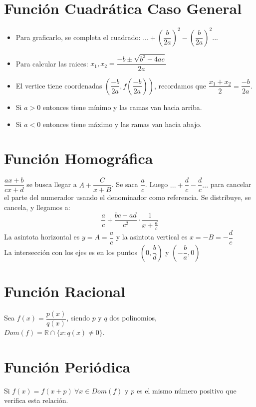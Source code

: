 \documentclass[11pt,a4paper]{article}
\begin{document}
\section{Funci\'on Cuadr\'atica Caso General}
\begin{itemize}
\item Para graficarlo, se completa el cuadrado: $... + \left(\dfrac{b}{2a}\right)^2 - \left(\dfrac{b}{2a}\right)^2...$
\item Para calcular las raices: $x_1, x_2 = \dfrac{-b \pm \sqrt{b^2 - 4ac}}{2a}$
\item El vertice tiene coordenadas $\left(\dfrac{-b}{2a}, f(\dfrac{-b}{2a})\right)$, recordamos que $\dfrac{x_1 + x_2}{2} = \dfrac{-b}{2a}$.
\item Si $a > 0$ entonces tiene m\'inimo y las ramas van hacia arriba.
\item Si $a < 0$ entonces tiene m\'aximo y las ramas van hacia abajo.
\end{itemize}

\section{Funci\'on Homogr\'afica}
\noindent $\dfrac{ax+b}{cx+d}$ se busca llegar a $A + \dfrac{C}{x+B}$. Se saca $\dfrac{a}{c}$. Luego $...+\dfrac{d}{c}-\dfrac{d}{c}...$ para cancelar el parte del numerador usando el denominador como referencia. Se distribuye, se cancela, y llegamos a:
$$\dfrac{a}{c} + \dfrac{bc-ad}{c^2} \cdot \dfrac{1}{x + \frac{d}{c}}$$
\noindent La asintota horizontal es $y = A = \dfrac{a}{c}$ y la asintota vertical es $x = -B = -\dfrac{d}{c}$\\

\noindent La intersecci\'on con los ejes es en los puntos $(0, \dfrac{b}{d})$ y $(-\dfrac{b}{a}, 0)$


\section{Funci\'on Racional}
\noindent Sea $f(x) = \dfrac{p(x)}{q(x)}$, siendo $p$ y $q$ dos polinomios, $Dom(f) = \mathbb{R} \cap \{x:q(x)\not = 0\}$.

\section{Funci\'on Peri\'odica}
Si $f(x) = f(x + p)\ \forall x \in Dom(f)$ y $p$ es el mismo n\'umero positivo que verifica esta relaci\'on.

\newpage
\end{document}
